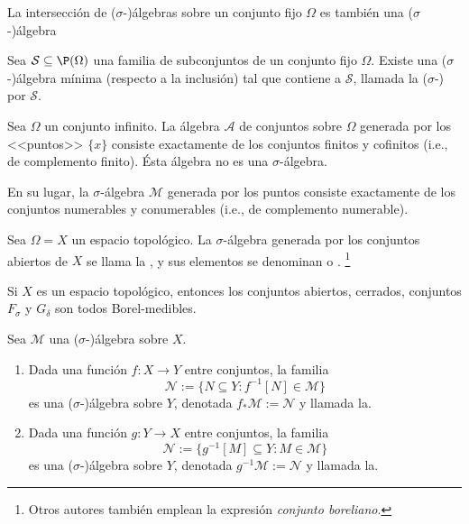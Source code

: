 \begin{prop}
	La intersección de ($\sigma$-)álgebras sobre un conjunto fijo $\Omega$ es también una ($\sigma$-)álgebra
\end{prop}
\begin{prop}
	Sea $\mathcal{S} \subseteq \P(\Omega)$ una familia de subconjuntos de un conjunto fijo $\Omega$.
	Existe una ($\sigma$-)álgebra mínima (respecto a la inclusión) tal que contiene a $\mathcal{S}$,
	llamada la ($\sigma$-) por $\mathcal{S}$.
\end{prop}
\begin{exn}
	Sea $\Omega$ un conjunto infinito.
	La álgebra $\mathscr{A}$ de conjuntos sobre $\Omega$ generada por los <<puntos>> $\{ x \}$
	consiste exactamente de los conjuntos finitos y cofinitos (i.e., de complemento finito).
	Ésta álgebra no es una $\sigma$-álgebra.

	En su lugar, la $\sigma$-álgebra $\mathscr{M}$ generada por los puntos consiste exactamente de los conjuntos numerables
	y conumerables (i.e., de complemento numerable).
\end{exn}

\begin{mydef}
	Sea $\Omega = X$ un espacio topológico.
	La $\sigma$-álgebra generada por los conjuntos abiertos de $X$ se llama la ,%
	y sus elementos se denominan  o .%
	\footnote{Otros autores también emplean la expresión \textit{conjunto boreliano}.}
\end{mydef}
\begin{ex}
	Si $X$ es un espacio topológico, entonces los conjuntos abiertos, cerrados, conjuntos $F_\sigma$ y $G_\delta$
	son todos Borel-medibles.
\end{ex}

\begin{prop}
	Sea $\mathscr{M}$ una ($\sigma$-)álgebra sobre $X$.
	\begin{enumerate}
		\item Dada una función $f \colon X \to Y$ entre conjuntos, la familia
			\[
				\mathscr{N} := \{ N \subseteq Y : f^{-1}[N] \in \mathscr{M} \}
			\]
			es una ($\sigma$-)álgebra sobre $Y$, denotada $f_*\mathscr{M} := \mathscr{N}$
			y llamada la\break {}.
		\item Dada una función $g \colon Y \to X$ entre conjuntos, la familia
			\[
				\mathscr{N} := \{ g^{-1}[M] \subseteq Y : M \in \mathscr{M} \}
			\]
			es una ($\sigma$-)álgebra sobre $Y$, denotada $g^{-1}\mathscr{M} := \mathscr{N}$
			y llamada la\break {}.
	\end{enumerate}
\end{prop}

